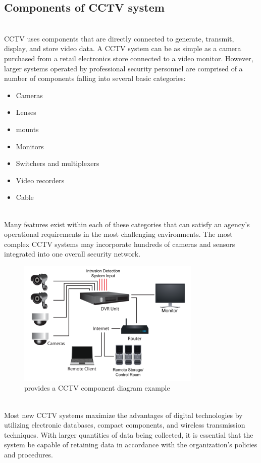 \documentclass[12pt,fleqn]{book} %
\begin{document}
\subsection{Components of CCTV system}
\\CCTV uses components that are directly connected to generate, transmit, display, and store video data. A CCTV system can be as simple as a camera purchased from a retail electronics store connected to a video monitor. However, larger systems operated by professional security personnel are comprised of a number of components falling into several basic categories: 
\begin{itemize}
    \item Cameras
    \item Lenses
    \item mounts
    \item Monitors
    \item Switchers and multiplexers 
    \item Video recorders
    \item Cable
 
\end{itemize}
\\Many features exist within each of these categories that can satisfy an agency’s operational requirements in the most challenging environments. The most complex CCTV systems may incorporate hundreds of cameras and sensors integrated into one overall security network. 
\begin{figure}[!h]
    \centering
    \includegraphics[width=0.5\linewidth]{c 1.png}
    \caption{provides a CCTV component diagram example}
    \label{fig:c 1}
    \end{figure}
    \\Most new CCTV systems maximize the advantages of digital technologies by utilizing electronic databases, compact components, and wireless transmission techniques. With larger quantities of data being collected, it is essential that the system be capable of retaining data in accordance with the organization’s policies and procedures. 
\end{document}
